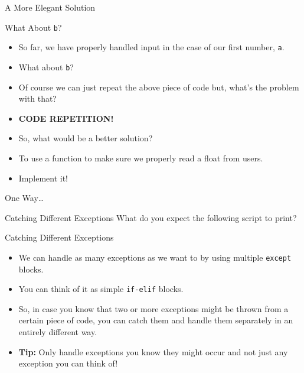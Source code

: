 \documentclass[aspectratio=169, 12pt, xcolor=table]{beamer}
\begin{document}
	\begin{frame}{A More Elegant Solution}
		
	\end{frame}
	
	\begin{frame}{What About \texttt{b}?}
		\begin{itemize}
			\item So far, we have properly handled input in the case of our first number, \texttt{a}.
			\item What about \texttt{b}?
			\item Of course we can just repeat the above piece of code but, what's the problem with that?\pause
			\item \textbf{CODE REPETITION!}
			\item So, what would be a better solution?
			\item To use a function to make sure we properly read a float from users.\pause
			\item Implement it!
		\end{itemize}
	\end{frame}

	\begin{frame}{One Way\ldots}
		
	\end{frame}

	\begin{frame}{Catching Different Exceptions}
		What do you expect the following script to print?
		
	\end{frame}

	\begin{frame}{Catching Different Exceptions}
		\begin{itemize}
			\item We can handle as many exceptions as we want to by using multiple \texttt{except} blocks.
			\item You can think of it as simple \texttt{if-elif} blocks.
			\item So, in case you know that two or more exceptions might be thrown from a certain piece of code, you can catch them and handle them separately in an entirely different way.
			\item \textbf{Tip:} Only handle exceptions you know they might occur and not just any exception you can think of!
		\end{itemize}
	\end{frame}
\end{document}
